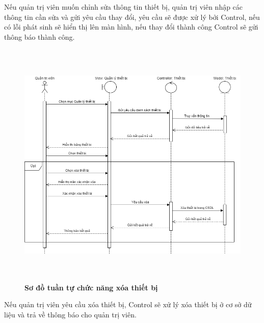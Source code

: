 Nếu quản trị viên muốn chỉnh sửa thông tin thiết bị, quản trị viên nhập các thông tin cần sửa và gửi yêu cầu thay đổi, yêu cầu sẽ được xử lý
bởi Control, nếu có lỗi phát sinh sẽ hiển thị lên màn hình, nếu thay đổi thành công Control sẽ gửi thông báo thành công. 
\begin{figure}[H]
  \centering
  \includegraphics[width=14cm,height=12cm]{Images/sequence/sequence_manage_delete_device.png}
  \caption[Sơ đồ tuần tự chức năng xóa thiết bị]{\bfseries \fontsize{12pt}{0pt}
  \selectfont Sơ đồ tuần tự chức năng xóa thiết bị}
  \label{sequence_manage_delete_device} %
\end{figure}
Nếu quản trị viên yêu cầu xóa thiết bị, Control sẽ xử lý xóa thiết bị ở cơ sở dữ liệu và trả về thông báo cho quản trị viên.

